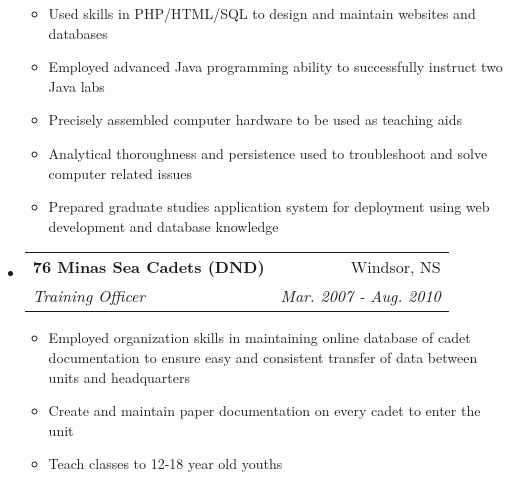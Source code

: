 \documentclass[letterpaper,11pt]{article}
\makeatletter
\newcommand{\resitem}[1]{\item #1 \vspace{-2pt}}
\newcommand{\ressubheading}[4]{
\begin{tabular*}{6.5in}{l@{\extracolsep{\fill}}r}
        \textbf{#1} & #2 \\
        \textit{#3} & \textit{#4} \\
\end{tabular*}\vspace{-6pt}}
\makeatother
\begin{document}
\begin{itemize}
                \begin{itemize}
                    \resitem{Used skills in PHP/HTML/SQL to design and maintain websites and databases}
                    \resitem{Employed advanced Java programming ability to successfully instruct two Java labs}
                    \resitem{Precisely assembled computer hardware to be used as teaching aids}
                    \resitem{Analytical thoroughness and persistence used to troubleshoot and solve computer related issues}
                    \resitem{Prepared graduate studies application system for deployment using web development and database knowledge}
                \end{itemize}
        \item[]
            \ressubheading{76 Minas Sea Cadets (DND)}{Windsor, NS}{Training Officer}{Mar. 2007 - Aug. 2010}
                \begin{itemize}
                    \resitem{Employed organization skills in maintaining online database of cadet documentation to ensure easy and consistent transfer of data
                    between units and headquarters}
                    \resitem{Create and maintain paper documentation on every cadet to enter the unit}
                    \resitem{Teach classes to 12-18 year old youths}
                \end{itemize}
\begin{comment}
        \item[]
            \ressubheading{HMCS Acadia (DND)}{Cornwallis NS}{Boatswain Divisional Officer}{July - Aug. 2007-2009}
                \begin{itemize}
                    \resitem{Solely responsible for 25 cadets, ages 13-18 from 6:00am to 8:00pm}
                    \resitem{Documented training and performance in corps life in thorough reports for each individual cadet}
                    \resitem{Disciplined cadets to appropriate levels when required}
                    \resitem{Effectively communicated information within classes}
                    \resitem{Developed leadership skills of cadets}
                \end{itemize}
\end{comment}
    \end{itemize}  %
\end{document}

